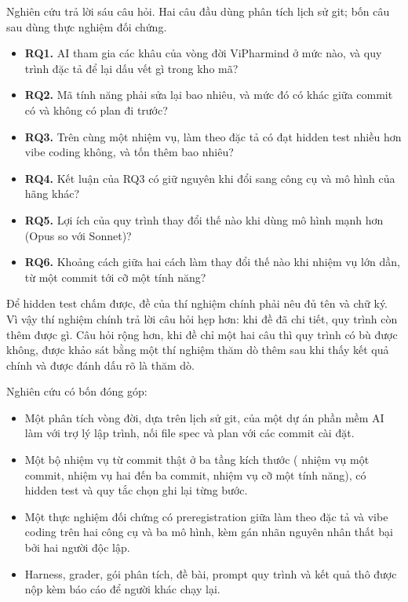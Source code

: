 Nghiên cứu trả lời sáu câu hỏi. Hai câu đầu dùng phân tích lịch sử git; bốn câu sau dùng thực
nghiệm đối chứng.
\begin{itemize}
\item \textbf{RQ1.} AI tham gia các khâu của vòng đời ViPharmind ở mức nào, và quy trình đặc tả để lại dấu
vết gì trong kho mã?
\item \textbf{RQ2.} Mã tính năng phải sửa lại bao nhiêu, và mức đó có khác giữa commit có và không có plan
đi trước?
\item \textbf{RQ3.} Trên cùng một nhiệm vụ, làm theo đặc tả có đạt hidden test nhiều hơn vibe coding không, và
tốn thêm bao nhiêu?
\item \textbf{RQ4.} Kết luận của RQ3 có giữ nguyên khi đổi sang công cụ và mô hình của hãng khác?
\item \textbf{RQ5.} Lợi ích của quy trình thay đổi thế nào khi dùng mô hình mạnh hơn (Opus so với Sonnet)?
\item \textbf{RQ6.} Khoảng cách giữa hai cách làm thay đổi thế nào khi nhiệm vụ lớn dần, từ một commit tới
cỡ một tính năng?
\end{itemize}

Để hidden test chấm được, đề của thí nghiệm chính phải nêu đủ tên và chữ ký. Vì vậy thí nghiệm chính trả lời câu
hỏi hẹp hơn: khi đề đã chi tiết, quy trình còn thêm được gì. Câu hỏi rộng hơn, khi đề chỉ một hai câu thì quy
trình có bù được không, được khảo sát bằng một thí nghiệm thăm dò thêm sau khi thấy kết quả chính và được
đánh dấu rõ là thăm dò.

Nghiên cứu có bốn đóng góp:
\begin{itemize}
\item Một phân tích vòng đời, dựa trên lịch sử git, của một dự án phần mềm AI làm với trợ lý lập trình, nối \NumSpecPlanFiles{}
file spec và plan với các commit cài đặt.
\item Một bộ \NumTasksMain{} nhiệm vụ từ commit thật ở ba tầng kích thước (\NumTasks{} nhiệm vụ một commit,
\NumMediumTasks{} nhiệm vụ hai đến ba commit, \NumFeatureTasks{} nhiệm vụ cỡ một tính năng), có hidden test và
quy tắc chọn ghi lại từng bước.
\item Một thực nghiệm đối chứng có preregistration giữa làm theo đặc tả và vibe coding trên hai công cụ và ba mô
hình, kèm gán nhãn nguyên nhân thất bại bởi hai người độc lập.
\item Harness, grader, gói phân tích, đề bài, prompt quy trình và kết quả thô được nộp kèm báo cáo để người khác chạy lại.
\end{itemize}

